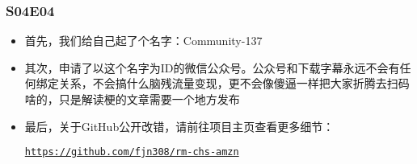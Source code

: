 \documentclass{ctexart}
\begin{document}
\subsubsection{S04E04}\label{gh}

\begin{itemize}
    \item 首先，我们给自己起了个名字：Community-137
    \item 其次，申请了以这个名字为ID的微信公众号。公众号和下载字幕永远不会有任何绑定关系，不会搞什么脑残流量变现，更不会像傻逼一样把大家折腾去扫码啥的，只是解读梗的文章需要一个地方发布
    \item 最后，关于GitHub公开改错，请前往项目主页查看更多细节： 
    
    \href{https://github.com/fjn308/rm-chs-amzn}{\texttt{https://github.com/fjn308/rm-chs-amzn}}
\end{itemize}
\end{document}

